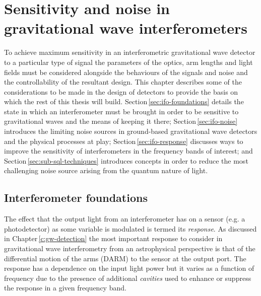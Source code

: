 \chapter{Sensitivity and noise in gravitational wave interferometers}
\label{c:instrumentation}

To achieve maximum sensitivity in an interferometric gravitational wave detector to a particular type of signal the parameters of the optics, arm lengths and light fields must be considered alongside the behaviours of the signals and noise and the controllability of the resultant design. This chapter describes some of the considerations to be made in the design of detectors to provide the basis on which the rest of this thesis will build. Section\,\ref{sec:ifo-foundations} details the state in which an interferometer must be brought in order to be sensitive to gravitational waves and the means of keeping it there; Section\,\ref{sec:ifo-noise} introduces the limiting noise sources in ground-based gravitational wave detectors and the physical processes at play; Section\,\ref{sec:ifo-response} discusses ways to improve the sensitivity of interferometers in the frequency bands of interest; and Section\,\ref{sec:sub-sql-techniques} introduces concepts in order to reduce the most challenging noise source arising from the quantum nature of light.

\section{\label{sec:ifo-foundations}Interferometer foundations}
The effect that the output light from an interferometer has on a sensor (e.g. a photodetector) as some variable is modulated is termed its \emph{response}. As discussed in Chapter\,\ref{c:gw-detection} the most important response to consider in gravitational wave interferometry from an astrophysical perspective is that of the differential motion of the arms (\gls{DARM}) to the sensor at the output port. The response has a dependence on the input light power but it varies as a function of frequency due to the presence of additional \emph{cavities} used to enhance or suppress the response in a given frequency band.

